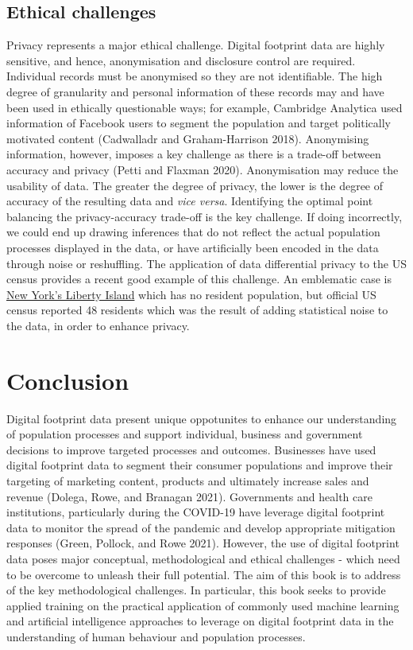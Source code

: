 \documentclass[
  letterpaper,
  DIV=11,
  numbers=noendperiod]{scrreprt}
\begin{document}
\hypertarget{ethical-challenges}{%
\subsection{Ethical challenges}\label{ethical-challenges}}

Privacy represents a major ethical challenge. Digital footprint data are
highly sensitive, and hence, anonymisation and disclosure control are
required. Individual records must be anonymised so they are not
identifiable. The high degree of granularity and personal information of
these records may and have been used in ethically questionable ways; for
example, Cambridge Analytica used information of Facebook users to
segment the population and target politically motivated content
(Cadwalladr and Graham-Harrison 2018). Anonymising information, however,
imposes a key challenge as there is a trade-off between accuracy and
privacy (Petti and Flaxman 2020). Anonymisation may reduce the usability
of data. The greater the degree of privacy, the lower is the degree of
accuracy of the resulting data and \emph{vice versa}. Identifying the
optimal point balancing the privacy-accuracy trade-off is the key
challenge. If doing incorrectly, we could end up drawing inferences that
do not reflect the actual population processes displayed in the data, or
have artificially been encoded in the data through noise or reshuffling.
The application of data differential privacy to the US census provides a
recent good example of this challenge. An emblematic case is
\href{https://www.bloomberg.com/news/articles/2021-08-12/data-scientists-ask-can-we-trust-the-2020-census}{New
York's Liberty Island} which has no resident population, but official US
census reported 48 residents which was the result of adding statistical
noise to the data, in order to enhance privacy.

\hypertarget{conclusion}{%
\section{Conclusion}\label{conclusion}}

Digital footprint data present unique oppotunites to enhance our
understanding of population processes and support individual, business
and government decisions to improve targeted processes and outcomes.
Businesses have used digital footprint data to segment their consumer
populations and improve their targeting of marketing content, products
and ultimately increase sales and revenue (Dolega, Rowe, and Branagan
2021). Governments and health care institutions, particularly during the
COVID-19 have leverage digital footprint data to monitor the spread of
the pandemic and develop appropriate mitigation responses (Green,
Pollock, and Rowe 2021). However, the use of digital footprint data
poses major conceptual, methodological and ethical challenges - which
need to be overcome to unleash their full potential. The aim of this
book is to address of the key methodological challenges. In particular,
this book seeks to provide applied training on the practical application
of commonly used machine learning and artificial intelligence approaches
to leverage on digital footprint data in the understanding of human
behaviour and population processes.
\end{document}
